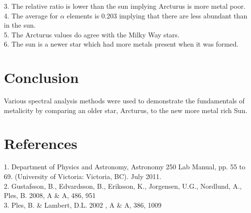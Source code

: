 \documentclass{article}
\begin{document}
3. The relative ratio is lower than the sun implying Arcturus is more metal poor.\\

4. The average for $\alpha$ elements is 0.203 implying that there are less abundant than in the sun.\\

5. The Arcturus values do agree with the Milky Way stars.\\

6. The sun is a newer star which had more metals present when it was formed.\\
\section{Conclusion}
Various spectral analysis methods were used to demonstrate the fundamentals of metalicity by comparing an older star, Arcturus, to the new more metal rich Sun.
\section{References}
1. Department of Physics and Astronomy, Astronomy 250 Lab Manual, pp. 55 to 69. (University of Victoria: Victoria, BC). July 2011.\\
2. Gustafsson, B., Edvardsson, B., Eriksson, K., Jorgensen, U.G., Nordlund, A., Ples, B. 2008, A \& A, 486, 951\\
3. Ples, B. \& Lambert, D.L. 2002 , A \& A, 386, 1009
\end{document}
